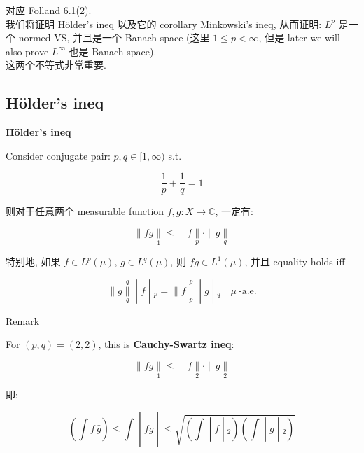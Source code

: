 \documentclass{qlnotes-export}
\begin{document}
对应 Folland 6.1(2).\\
我们将证明 Hölder's ineq 以及它的 corollary Minkowski's ineq, 从而证明: \(L^{p}\) 是一个 normed VS, 并且是一个 Banach space (这里 \(1 \leq p < \infty\), 但是 later we will also prove \(L^{\infty}\) 也是 Banach space).\\
这两个不等式非常重要.

\subsection{Hölder's ineq}\label{huxf6lders-ineq}

\begin{theorem}{\protect{}\label{kn-holder-inequality}{\textbf{Hölder's
ineq}}}

Consider conjugate pair: \(p,q \in \lbrack 1,\infty)\) s.t.

\[\frac{1}{p} + \frac{1}{q} = 1\]

则对于任意两个 measurable function \(f,g:X\rightarrow{\mathbb{C}}\), 一定有:

\[\parallel fg\underset{1}{\parallel} \leq \parallel f\underset{p}{\parallel} \cdot \parallel g\underset{q}{\parallel}\]

特别地, 如果 \(f \in L^{p}(\mu)\), \(g \in L^{q}(\mu)\), 则 \(fg \in L^{1}(\mu)\), 并且 equality holds iff

\[\left. \parallel g\underset{q}{\overset{q}{\parallel}} \middle| f \middle| {}_{p} = \parallel f\underset{p}{\overset{p}{\parallel}} \middle| g \middle| {}_{q}\quad\mu\ \text{-a.e.} \right.\]

\end{theorem}

\begin{qlremark}{Remark}

For \((p,q) = (2,2)\), this is \textbf{Cauchy-Swartz ineq}:

\[\parallel fg\underset{1}{\parallel} \leq \parallel f\underset{2}{\parallel} \cdot \parallel g\underset{2}{\parallel}\]

即:

\[\left. (\int f\,\bar{g}) \leq \int \middle| fg \middle| \leq \sqrt{\left. (\int \middle| f \middle| {}_{2})(\int \middle| g \middle| {}_{2}) \right.} \right.\]

\end{qlremark}
\end{document}
